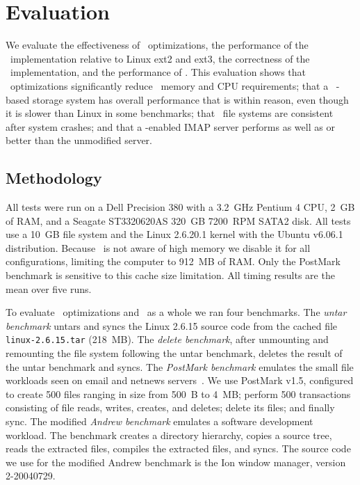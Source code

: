 
\section {Evaluation}
\label{sec:evaluation}
\label{eval}

We evaluate
%
the effectiveness of \patch\ optimizations,
%
the performance of the \Kudos\ implementation relative to Linux ext2
and ext3,
%
the correctness of the \Kudos\ implementation,
%
and the performance of \patchgroups.
%
This evaluation shows
%
that \patch\ optimizations significantly reduce \patch\ memory and CPU
requirements;
%
that a \Kudos\ \patch-based storage system has overall performance
that is within reason, even though it is slower than Linux in some
benchmarks;
%
that \Kudos\ file systems are consistent after system crashes;
%
and that a \patchgroup-enabled IMAP server performs as well as or
better than the unmodified server.

\subsection{Methodology}

All tests were run on a Dell Precision 380 with a 3.2~GHz Pentium 4
CPU, 2~GB of RAM, and a Seagate ST3320620AS 320~GB 7200~RPM SATA2 disk.
%
All tests use a 10~GB file system and the Linux 2.6.20.1 kernel
with the Ubuntu v6.06.1 distribution.
%
Because \Kudos\ is not aware of high memory we disable it for all
configurations, limiting the computer to 912~MB of RAM.
%
Only the PostMark benchmark is sensitive to this cache size limitation.
%
All timing results are the mean over five runs.

To evaluate \patch\ optimizations and \Kudos\ as a whole we ran four
benchmarks.
%
The \emph{untar benchmark} untars and syncs the Linux 2.6.15 source code
from the cached file \texttt{linux-2.6.15.tar} (218~MB).
%
The \emph{delete benchmark}, after unmounting and remounting the file
system following the untar benchmark, deletes the result of the untar
benchmark and syncs.
%
The \emph{PostMark benchmark} emulates the small file workloads seen
on email and netnews servers~\cite{postmark}. We use PostMark v1.5,
configured to create 500 files ranging in size from 500~B to 4~MB;
perform 500 transactions consisting of file reads, writes, creates,
and deletes; delete its files; and finally sync.
%
The modified \emph{Andrew benchmark} emulates a software development
workload.  The benchmark creates a directory hierarchy, copies a
source tree, reads the extracted files, compiles the extracted files,
and syncs. The source code we use for the modified Andrew benchmark is
the Ion window manager, version 2-20040729.

